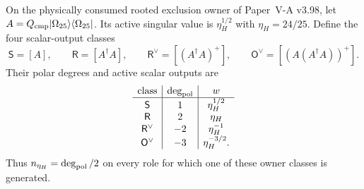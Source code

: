 \documentclass[12pt,a4paper]{article}
\begin{document}
\begin{definition}
\label{p6:def:v591-polar-comparison-classes}
On the physically consumed rooted exclusion owner of Paper~V-A v3.98, let
$A=Q_{\rm cmp}|\Omega_{25}\rangle\langle\Omega_{25}|$.  Its active singular
value is $\eta_H^{1/2}$ with $\eta_H=24/25$.  Define the four scalar-output
classes
\[
 \mathsf S=[A],\qquad
 \mathsf R=[A^\dagger A],\qquad
 \mathsf R^\vee=[(A^\dagger A)^+],\qquad
 \mathsf O^\vee=[(A(A^\dagger A))^+].
\]
Their polar degrees and active scalar outputs are
\[
\begin{array}{c|c|c}
\text{class}&\deg_{\rm pol}&w\\\hline
\mathsf S&1&\eta_H^{1/2}\\
\mathsf R&2&\eta_H\\
\mathsf R^\vee&-2&\eta_H^{-1}\\
\mathsf O^\vee&-3&\eta_H^{-3/2}.
\end{array}
\]
Thus $n_{\eta_H}=\deg_{\rm pol}/2$ on every role for which one of these
owner classes is generated.
\end{definition}
\end{document}
